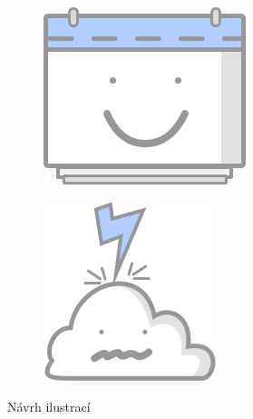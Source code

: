 \documentclass[twoside]{ctuthesis}
\begin{document}
\begin{figure}[h]
\begin{subfigure}[b]{.24\textwidth}
		\label{fig:il-history}
	\end{subfigure}
	\begin{subfigure}[b]{.24\textwidth}
		\centering
		\includegraphics[width=.9\linewidth]{img/il-schedule.png}
		\label{fig:il-schedule}
	\end{subfigure}%
	\begin{subfigure}[b]{.24\textwidth}
		\centering
		\includegraphics[width=.9\linewidth]{img/il-connection.png}
		\label{fig:il-connection}
	\end{subfigure}
	\caption{Návrh ilustrací}
\end{figure}
\end{document}
